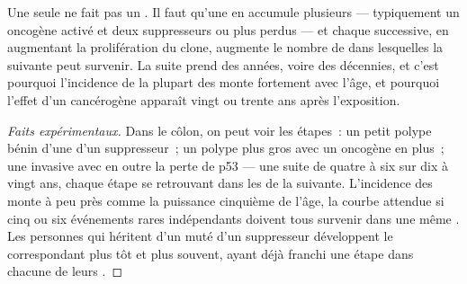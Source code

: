 \begin{proposition}\label{prop:g11:cancer:multistep}
Une seule  ne fait pas un . Il faut qu'une  en
accumule plusieurs --- typiquement un oncogène activé et deux
suppresseurs ou plus perdus --- et chaque  successive, en
augmentant la prolifération du clone, augmente le nombre de 
dans lesquelles la suivante peut survenir. La suite prend des années,
voire des décennies, et c'est pourquoi l'incidence de la plupart des
 monte fortement avec l'âge, et pourquoi l'effet d'un
cancérogène apparaît vingt ou trente ans après l'exposition.
\end{proposition}
\begin{proof}[Faits expérimentaux]
Dans le côlon, on peut voir les étapes~: un petit polype bénin 
d'une  d'un suppresseur~; un polype plus gros avec un oncogène
en plus~; une  invasive avec en outre la perte de p53 --- une
suite de quatre à six  sur dix à vingt ans, chaque étape se
retrouvant dans les  de la suivante. L'incidence des 
monte à peu près comme la puissance cinquième de l'âge, la courbe
attendue si cinq ou six événements rares indépendants doivent tous
survenir dans une même . Les personnes qui héritent d'un 
muté d'un  suppresseur développent le  correspondant plus tôt
et plus souvent, ayant déjà franchi une étape dans chacune de leurs
.
\end{proof}

